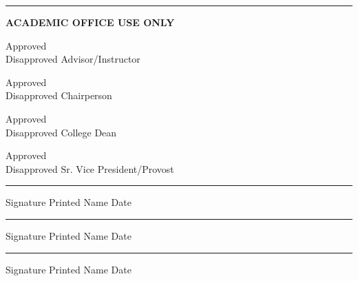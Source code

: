 \documentclass{article}
\begin{document}
\begin{Form}
\noindent\rule{32cm}{0.01pt}

\hspace{12cm}\textbf{\Large ACADEMIC OFFICE USE ONLY}
\vspace{-2mm}
\begin{multicols}{3}

\parbox{0.8\columnwidth}{
    Approved \\
    Disapproved \hspace{0.5cm}Advisor/Instructor 
    \vspace{0.2cm}

    Approved \\
    Disapproved \hspace{0.5cm}Chairperson 
    \vspace{0.2cm}

    Approved \\
    Disapproved \hspace{0.5cm}College Dean
    \vspace{0.2cm}

    Approved \\
    Disapproved \hspace{0.5cm}Sr. Vice President/Provost 
}

\columnbreak

\parbox{0.8\columnwidth}{
    \rule{3cm}{0.4pt}  
    \hspace{0.1cm} \TextField[name=p-name, width=3.5cm]{}
    \hspace{0.1cm} \TextField[name=o-date, width=1.5cm]{}
    \small Signature \hspace{1.8cm}\small Printed Name \hspace{1.8cm}\small Date

    \rule{3cm}{0.4pt}  
    \hspace{0.1cm} \TextField[name=p-name, width=3.5cm]{}
    \hspace{0.1cm} \TextField[name=o-date, width=1.5cm]{}
    \small Signature \hspace{1.8cm}\small Printed Name \hspace{1.8cm}\small Date

    \rule{3cm}{0.4pt}  
    \hspace{0.1cm} \TextField[name=p-name, width=3.5cm]{}
    \hspace{0.1cm} \TextField[name=o-date, width=1.5cm]{}
    \small Signature \hspace{1.8cm}\small Printed Name \hspace{1.8cm}\small Date

}
\end{multicols}
\end{Form}
\end{document}
